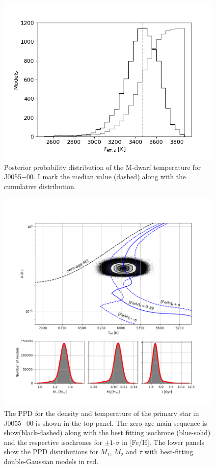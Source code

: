 \begin{figure}
    \centering
    \includegraphics[scale=1]{8-Results/J0055-00/T2.png}
    \caption{Posterior probability distribution of the M-dwarf temperature for J0055$-$00. I mark the median value (dashed) along with the cumulative distribution.  }
    \label{fig:J0055-00:T2}
\end{figure}


\begin{figure}[htb]
    \centering
    \includegraphics[scale=0.7]{8-Results/J0055-00/HR.png}
    \caption{The PPD for the density and temperature of the primary star in J0055$-$00 is shown in the top panel. The zero-age main sequence is show(black-dashed) along with the best fitting isochrone (blue-solid) and the respective isochrones for $\pm1$-$\sigma$ in [Fe/H]. The lower panels show the PPD distributions for $M_1$, $M_2$ and $\tau$ with best-fitting double-Gaussian models in red. }
    \label{fig:J0055-00:HR}
\end{figure}

